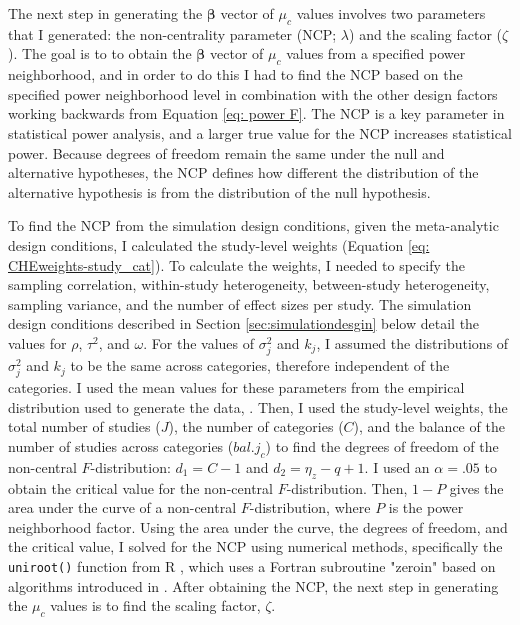 The next step in generating the $\bm{\beta}$ vector of $\mu_c$ values involves two parameters that I generated: the non-centrality parameter (NCP; $\lambda$) and the scaling factor ($\zeta$). The goal is to to obtain the $\bm{\beta}$ vector of $\mu_c$ values from a specified power neighborhood, and in order to do this I had to find the NCP based on the specified power neighborhood level in combination with the other design factors working backwards from Equation \ref{eq: power F}. The NCP is a key parameter in statistical power analysis, and a larger true value for the NCP increases statistical power. Because degrees of freedom remain the same under the null and alternative hypotheses, the NCP defines how different the distribution of the alternative hypothesis is from the distribution of the null hypothesis. 

To find the NCP from the simulation design conditions, given the meta-analytic design conditions, I calculated the study-level weights (Equation \ref{eq: CHEweights-study_cat}). To calculate the weights, I needed to specify the sampling correlation, within-study heterogeneity, between-study heterogeneity, sampling variance, and the number of effect sizes per study. The simulation design conditions described in Section \ref{sec:simulationdesgin} below detail the values for $\rho$, $\tau^2$, and $\omega$. For the values of $\sigma_j^2$ and $k_j$, I assumed the distributions of $\sigma_j^2$ and $k_j$ to be the same across categories, therefore independent of the categories. I used the mean values for these parameters from the empirical distribution used to generate the data, \textcite{WilliamsRyan2022HiMI}. 
Then, I used the study-level weights, the total number of studies ($J$),  the number of categories ($C$), and the balance of the number of studies across categories ($bal. j_c$) to find the degrees of freedom of the non-central $F$-distribution: $d_1 = C-1$ and $d_2 = \eta_z - q + 1$. I used an $\alpha=.05$ to obtain the critical value for the non-central $F$-distribution. Then, $1-P$ gives the area under the curve of a non-central $F$-distribution, where $P$ is the power neighborhood factor. Using the area under the curve, the degrees of freedom, and the critical value, I solved for the NCP using numerical methods, specifically the \texttt{uniroot()} function from R \autocite{R}, which uses a Fortran subroutine "zeroin" based on algorithms introduced in \textcite{brent2013}. After obtaining the NCP, the next step in generating the $\mu_c$ values is to find the scaling factor, $\zeta$.

